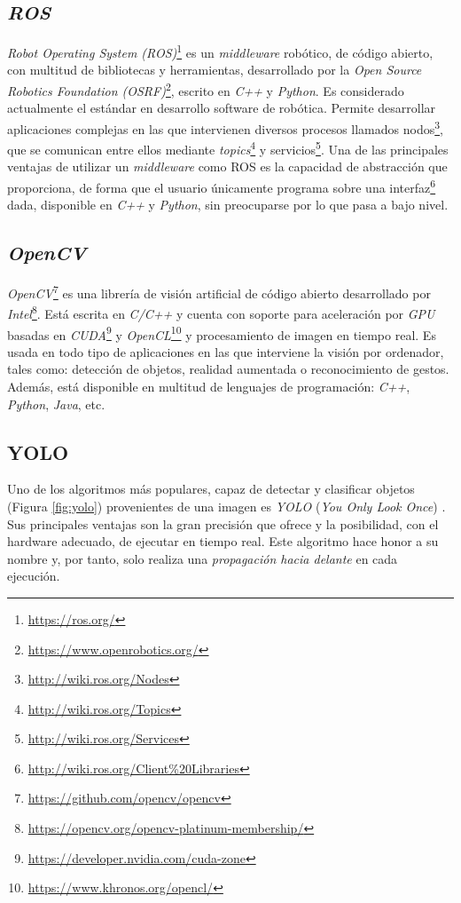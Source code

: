 \subsection{\textit{ROS}}
\label{subsection:ros}
\textit{Robot Operating System (ROS)}\footnote{\url{https://ros.org/}} es un \textit{middleware} robótico, de código abierto, con multitud de bibliotecas y herramientas, desarrollado por la \textit{Open Source Robotics Foundation (OSRF)}\footnote{\url{https://www.openrobotics.org/}}, escrito en \textit{C++} y \textit{Python}. Es considerado actualmente el estándar en desarrollo software de robótica. Permite desarrollar aplicaciones complejas en las que intervienen diversos procesos llamados nodos\footnote{\url{http://wiki.ros.org/Nodes}}, que se comunican entre ellos mediante \textit{topics}\footnote{\url{http://wiki.ros.org/Topics}} y servicios\footnote{\url{http://wiki.ros.org/Services}}. Una de las principales ventajas de utilizar un \textit{middleware} como ROS es la capacidad de abstracción que proporciona, de forma que el usuario únicamente programa sobre una interfaz\footnote{\url{http://wiki.ros.org/Client\%20Libraries}} dada, disponible en \textit{C++} y \textit{Python}, sin preocuparse por lo que pasa a bajo nivel.\\

\subsection{\textit{OpenCV}}
\label{subsection:opencv}
\textit{OpenCV}\footnote{\url{https://github.com/opencv/opencv}} es una librería de visión artificial de código abierto desarrollado por \textit{Intel}\footnote{\url{https://opencv.org/opencv-platinum-membership/}}. Está escrita en \textit{C/C++} y cuenta con soporte para aceleración por \textit{GPU} basadas en \textit{CUDA}\footnote{\url{https://developer.nvidia.com/cuda-zone}} y \textit{OpenCL}\footnote{\url{https://www.khronos.org/opencl/}} y procesamiento de imagen en tiempo real. Es usada en todo tipo de aplicaciones en las que interviene la visión por ordenador, tales como: detección de objetos, realidad aumentada o reconocimiento de gestos. Además, está disponible en multitud de lenguajes de programación: \textit{C++}, \textit{Python}, \textit{Java}, etc.\\

\subsection{YOLO}
\label{sec:yolo}
Uno de los algoritmos más populares, capaz de detectar y clasificar objetos (Figura \ref{fig:yolo}) provenientes de una imagen es \textit{YOLO} (\textit{You Only Look Once}) \cite{yolov3}. Sus principales ventajas son la gran precisión que ofrece y la posibilidad, con el hardware adecuado, de ejecutar en tiempo real. Este algoritmo hace honor a su nombre y, por tanto, solo realiza una \textit{propagación hacia delante} en cada ejecución.\\


